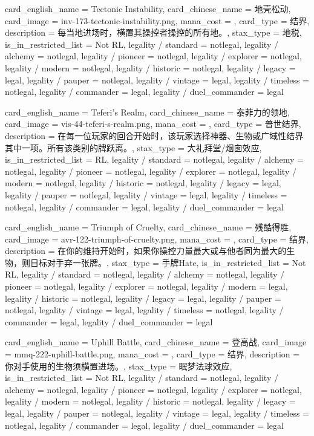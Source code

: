 \documentclass[lang = cn, color = black, 10pt]{AllThatStax}
\begin{document}
\card
{
	card_english_name = {Tectonic Instability},
	card_chinese_name = {地壳松动},
	card_image = inv-173-tectonic-instability.png,
	mana_cost = ,
	card_type = 结界,
	description = {每当地进场时，横置其操控者操控的所有地。},
	stax_type = 地税,
	is_in_restricted_list = Not RL,
	legality / standard = notlegal,
	legality / alchemy = notlegal,
	legality / pioneer = notlegal,
	legality / explorer = notlegal,
	legality / modern = notlegal,
	legality / historic = notlegal,
	legality / legacy = legal,
	legality / pauper = notlegal,
	legality / vintage = legal,
	legality / timeless = notlegal,
	legality / commander = legal,
	legality / duel_commander = legal
}

\card
{
	card_english_name = {Teferi's Realm},
	card_chinese_name = {泰菲力的领地},
	card_image = vis-44-teferi-s-realm.png,
	mana_cost = ,
	card_type = 普世结界,
	description = {在每一位玩家的回合开始时，该玩家选择神器、生物或广域性结界其中一项。所有该类别的牌跃离。},
	stax_type = 大礼拜堂/烟囱效应,
	is_in_restricted_list = RL,
	legality / standard = notlegal,
	legality / alchemy = notlegal,
	legality / pioneer = notlegal,
	legality / explorer = notlegal,
	legality / modern = notlegal,
	legality / historic = notlegal,
	legality / legacy = legal,
	legality / pauper = notlegal,
	legality / vintage = legal,
	legality / timeless = notlegal,
	legality / commander = legal,
	legality / duel_commander = legal
}

\card
{
	card_english_name = {Triumph of Cruelty},
	card_chinese_name = {残酷得胜},
	card_image = avr-122-triumph-of-cruelty.png,
	mana_cost = ,
	card_type = 结界,
	description = {在你的维持开始时，如果你操控力量最大或与他者同为最大的生物，则目标对手弃一张牌。},
	stax_type = 手牌Hate,
	is_in_restricted_list = Not RL,
	legality / standard = notlegal,
	legality / alchemy = notlegal,
	legality / pioneer = notlegal,
	legality / explorer = notlegal,
	legality / modern = legal,
	legality / historic = notlegal,
	legality / legacy = legal,
	legality / pauper = notlegal,
	legality / vintage = legal,
	legality / timeless = notlegal,
	legality / commander = legal,
	legality / duel_commander = legal
}

\card
{
	card_english_name = {Uphill Battle},
	card_chinese_name = {登高战},
	card_image = mmq-222-uphill-battle.png,
	mana_cost = ,
	card_type = 结界,
	description = {你对手使用的生物须横置进场。},
	stax_type = 眠梦法球效应,
	is_in_restricted_list = Not RL,
	legality / standard = notlegal,
	legality / alchemy = notlegal,
	legality / pioneer = notlegal,
	legality / explorer = notlegal,
	legality / modern = notlegal,
	legality / historic = notlegal,
	legality / legacy = legal,
	legality / pauper = notlegal,
	legality / vintage = legal,
	legality / timeless = notlegal,
	legality / commander = legal,
	legality / duel_commander = legal
}
\end{document}
